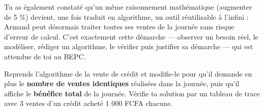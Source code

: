 \documentclass[11pt]{article}
\begin{document}
Tu as également constaté qu'un même raisonnement mathématique (augmenter de 5 \%) devient, une fois traduit en algorithme, un outil réutilisable à l'infini : Armand peut désormais traiter toutes ses ventes de la journée sans risque d'erreur de calcul. C'est exactement cette démarche — observer un besoin réel, le modéliser, rédiger un algorithme, le vérifier puis justifier sa démarche — qui est attendue de toi au BEPC.

\begin{exercice}
Reprends l'algorithme de la vente de crédit et modifie-le pour qu'il demande en plus le \textbf{nombre de ventes identiques} réalisées dans la journée, puis qu'il affiche le \textbf{bénéfice total} de la journée. Vérifie ta solution par un tableau de trace avec 3 ventes d'un crédit acheté 1 000 FCFA chacune.
\end{exercice}
\end{document}
